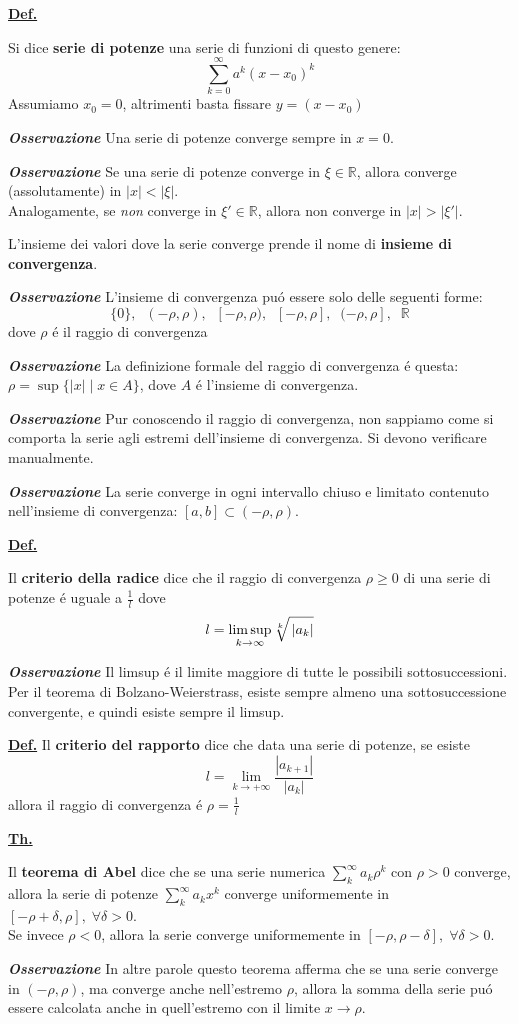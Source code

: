 \documentclass[a4paper,10pt]{article} %
\renewcommand{\b}[1]{%
    {\textbf{#1}}}
\newcommand{\ldef}[1]{%
    {\smallbreak\par\tiny\textbf{\underline{Def.}} {#1} \smallbreak}}
\newcommand{\ltheorem}[1]{%
    {\smallbreak\par\tiny\textbf{\underline{Th.}} {#1} \smallbreak\par}}
\newcommand{\loss}[1]{%
    {\smallbreak\par\tiny\emph{\textbf{Osservazione}} {#1} \par}}
\begin{document}
\begin{multicols}{6}
\ldef{
    Si dice \b{serie di potenze} una serie di funzioni di questo genere:
    \[
        \sum_{k=0}^\infty a^k (x - x_0)^k
    \]
    Assumiamo $x_0 = 0$, altrimenti basta fissare $y = (x - x_0)$
    \loss{
        Una serie di potenze converge sempre in $ x = 0 $.
    }
    \loss{
        Se una serie di potenze converge in $ \xi \in \mathbb{R} $, allora converge (assolutamente) in $ |x| < |\xi|$.\\
        Analogamente, se \emph{non} converge in $ \xi'  \in \mathbb{R} $, allora non converge in $ |x| > |\xi'|$.
    }
    L'insieme dei valori dove la serie converge prende il nome di \b{insieme di convergenza}. 
    \loss{
        L'insieme di convergenza pu\'{o} essere solo delle seguenti forme: 
        \[
            \{0\},\;\; (-\rho, \rho),\;\; [-\rho, \rho),\;\; \left[-\rho,
            \rho\right],\;\; (-\rho, \rho],\;\; \mathbb{R}
        \]
    dove $\rho$ \'{e} il raggio di convergenza
    }
    \loss{
        La definizione formale del raggio di convergenza \'{e} questa:
        $ \rho = \sup \{ |x| \mid x \in A \}$, dove $A$ \'{e} l'insieme di convergenza.
    }
    \loss{
        Pur conoscendo il raggio di convergenza, non sappiamo come si comporta
        la serie agli estremi dell'insieme di convergenza. Si devono verificare
        manualmente.
    }
    \loss{
        La serie converge in ogni intervallo chiuso e limitato contenuto
        nell'insieme di convergenza: $[a,b] \subset (-\rho, \rho)$.
    }
}

\ldef{
    Il \b{criterio della radice} dice che il raggio di convergenza $ \rho \geq 0 $ di una serie 
    di potenze \'{e} uguale a $\frac{1}{l}$ dove 
    \[
    l = \limsup_{k\to\infty} \sqrt[k]{\vphantom{\sum} \left| a_k \right| }
    \]
    \loss{
        Il limsup \'{e} il limite maggiore di tutte le possibili sottosuccessioni. Per il teorema di Bolzano-Weierstrass, esiste sempre almeno una sottosuccessione convergente, e quindi esiste sempre il limsup.
        }
}

\ldef{
    Il \b{criterio del rapporto} dice che data una serie di potenze, se esiste
    \[
        l = \lim_{k\to+\infty} \frac{|a_{k+1}|}{|a_k|}
    \]
    allora il raggio di convergenza \'{e} $ \rho = \frac{1}{l}$
}

\ltheorem{
    Il \b{teorema di Abel} dice che se una serie numerica $ \sum_k^\infty a_k \rho^k $ con $ \rho > 0 $ converge, allora la serie di potenze $ \sum_k^\infty a_k x^k$ converge uniformemente in $[-\rho + \delta, \rho ], \; \forall \delta > 0$. \\
    Se invece $ \rho < 0$, allora la serie converge uniformemente in $[-\rho, \rho - \delta], \; \forall \delta > 0$.
    \loss{
        In altre parole questo teorema afferma che se una serie converge in $(-\rho, \rho)$,
        ma converge anche nell'estremo $\rho$, allora la somma della serie pu\'o 
        essere calcolata anche in quell'estremo con il limite $x \rightarrow \rho$.
    }
}


\end{multicols}
\end{document}
